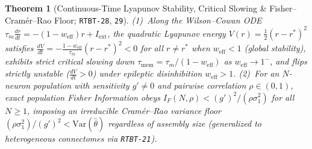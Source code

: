 \documentclass[11pt,letterpaper]{article}
\newtheorem{theorem}{Theorem}[section]
\newcommand{\code}[1]{\texttt{\small #1}}
\begin{document}
\begin{theorem}[Continuous-Time Lyapunov Stability, Critical Slowing \& Fisher--Cram\'er--Rao Floor; \code{RTBT-28}, \code{29}]
(1)~Along the Wilson--Cowan ODE $\tau_m \frac{dr}{dt} = -(1-w_{\mathrm{eff}})r + I_{\mathrm{ext}}$, the quadratic Lyapunov energy $V(r) = \frac{1}{2}(r-r^*)^2$ satisfies $\frac{dV}{dt} = -\frac{1-w_{\mathrm{eff}}}{\tau_m}(r-r^*)^2 < 0$ for all $r \neq r^*$ when $w_{\mathrm{eff}} < 1$ (global stability), exhibits strict critical slowing down $\tau_{\mathrm{mem}} = \tau_m/(1-w_{\mathrm{eff}})$ as $w_{\mathrm{eff}} \to 1^-$, and flips strictly unstable ($\frac{dV}{dt} > 0$) under epileptic disinhibition $w_{\mathrm{eff}} > 1$.
(2)~For an $N$-neuron population with sensitivity $g' \neq 0$ and pairwise correlation $\rho \in (0,1)$, exact population Fisher Information obeys $I_F(N,\rho) < (g')^2/(\rho\sigma_1^2)$ for all $N \ge 1$, imposing an irreducible Cram\'er--Rao variance floor $(\rho\sigma_1^2)/(g')^2 < \mathrm{Var}(\hat{\theta})$ regardless of assembly size (generalized to heterogeneous connectomes via \code{RTBT-21}).
\end{theorem}
\end{document}
